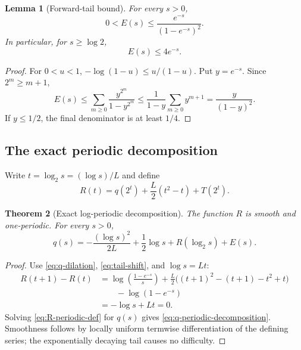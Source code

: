 \documentclass[11pt,oneside]{article}
\newtheorem{theorem}{Theorem}[section]
\newtheorem{lemma}[theorem]{Lemma}
\theoremstyle{definition}
\theoremstyle{remark}
\newcommand{\Ltwo}{L}
\begin{document}
\begin{lemma}[Forward-tail bound]\label{lem:forward-tail-bound}
For every $s>0$,
\begin{equation}\label{eq:forward-tail-bound}
  0<E(s)\le\frac{e^{-s}}{(1-e^{-s})^2}.
\end{equation}
In particular, for $s\ge\log2$,
\begin{equation}\label{eq:forward-tail-four}
  E(s)\le4e^{-s}.
\end{equation}
\end{lemma}

\begin{proof}
For $0<u<1$, $-\log(1-u)\le u/(1-u)$.  Put $y=e^{-s}$.  Since
$2^m\ge m+1$,
\[
 E(s)\le\sum_{m\ge0}\frac{y^{2^m}}{1-y^{2^m}}
 \le\frac1{1-y}\sum_{m\ge0}y^{m+1}
 =\frac{y}{(1-y)^2}.
\]
If $y\le1/2$, the final denominator is at least $1/4$.
\end{proof}

\subsection{The exact periodic decomposition}

Write $t=\log_2s=(\log s)/\Ltwo$ and define
\begin{equation}\label{eq:R-periodic-def}
  R(t)=q(2^t)+\frac{\Ltwo}{2}(t^2-t)+T(2^t).
\end{equation}

\begin{theorem}[Exact log-periodic decomposition]\label{thm:periodic-decomposition}
The function $R$ is smooth and one-periodic.  For every $s>0$,
\begin{equation}\label{eq:q-periodic-decomposition}
 q(s)=-\frac{(\log s)^2}{2\Ltwo}
      +\frac12\log s
      +R(\log_2s)+E(s).
\end{equation}
\end{theorem}

\begin{proof}
Use \eqref{eq:q-dilation}, \eqref{eq:tail-shift}, and
$\log s=\Ltwo t$:
\begin{align*}
 R(t+1)-R(t)
 &=\log\left(\frac{1-e^{-s}}s\right)
   +\frac{\Ltwo}{2}\bigl((t+1)^2-(t+1)-t^2+t\bigr)\\
 &\qquad-\log(1-e^{-s})\\
 &=-\log s+\Ltwo t=0.
\end{align*}
Solving \eqref{eq:R-periodic-def} for $q(s)$ gives
\eqref{eq:q-periodic-decomposition}.  Smoothness follows by locally uniform
termwise differentiation of the defining series; the exponentially decaying tail
causes no difficulty.
\end{proof}
\end{document}
